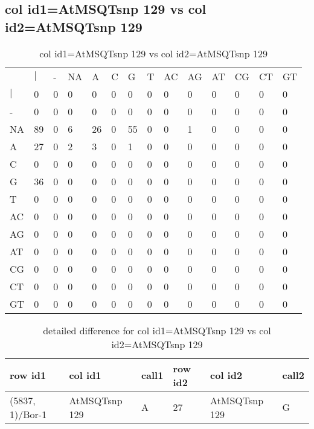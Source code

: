 \subsection{col id1=AtMSQTsnp 129 vs col id2=AtMSQTsnp 129}
\begin{center}
\begin{longtable}{|l|l|l|l|l|l|l|l|l|l|l|l|l|l|}
\caption{col id1=AtMSQTsnp 129 vs col id2=AtMSQTsnp 129} \label{table_dm518}\\
\hline
\\
\hline
&$|$&-&NA&A&C&G&T&AC&AG&AT&CG&CT&GT\\
$|$&0&0&0&0&0&0&0&0&0&0&0&0&0\\
-&0&0&0&0&0&0&0&0&0&0&0&0&0\\
NA&89&0&6&26&0&55&0&0&1&0&0&0&0\\
A&27&0&2&3&0&1&0&0&0&0&0&0&0\\
C&0&0&0&0&0&0&0&0&0&0&0&0&0\\
G&36&0&0&0&0&0&0&0&0&0&0&0&0\\
T&0&0&0&0&0&0&0&0&0&0&0&0&0\\
AC&0&0&0&0&0&0&0&0&0&0&0&0&0\\
AG&0&0&0&0&0&0&0&0&0&0&0&0&0\\
AT&0&0&0&0&0&0&0&0&0&0&0&0&0\\
CG&0&0&0&0&0&0&0&0&0&0&0&0&0\\
CT&0&0&0&0&0&0&0&0&0&0&0&0&0\\
GT&0&0&0&0&0&0&0&0&0&0&0&0&0\\
\hline
\end{longtable}
\end{center}

\begin{center}
\begin{longtable}{|l|l|l|l|l|l|}
\caption{detailed difference for col id1=AtMSQTsnp 129 vs col id2=AtMSQTsnp 129} \label{table_dm519}\\
\hline
row id1&col id1&call1&row id2&col id2&call2\\
\hline
(5837, 1)/Bor-1&AtMSQTsnp 129&A&27&AtMSQTsnp 129&G\\
\hline
\end{longtable}
\end{center}

